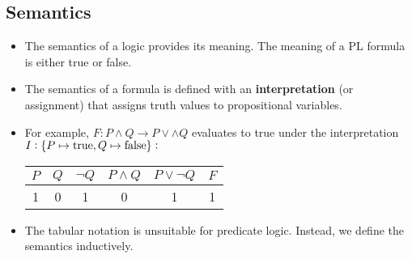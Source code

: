 \subsection{Semantics}
\begin{itemize}
	\item The semantics of a logic provides its meaning. The meaning of a PL formula is either true or false.
	\item The semantics of a formula is defined with an \textbf{interpretation} (or assignment) that assigns truth values to propositional variables.
	\item For example, $F:P\land Q\to P\lor\land Q$ evaluates to true under the interpretation $I:\set{P\mapsto \text{true},Q\mapsto\text{false}}:$
	\begin{table}[h!]\centering{}
		\begin{tabular}{c|c||c|c|c|c}
			\hline
			$P$ & $Q$ & $\lnot Q$ & $P\land Q$ & $P\lor \lnot Q$ & $F$ \\ \hline
			1 & 0 & 1 & 0 & 1 & 1 \\ \hline
		\end{tabular}
	\end{table}
	\item The tabular notation is unsuitable for predicate logic. Instead, we define the semantics inductively.
\end{itemize}

